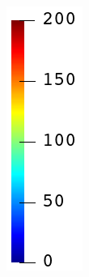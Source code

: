 \begin{figure}[!htb]
\begin{subfigure}{0.04\textwidth}
    \includegraphics[width=\textwidth,scale=0.5]{Chapter5/figures/SFC/colorbar_Wp_vertical}
    \vspace{1em}
  \end{subfigure}
  

\end{figure}
